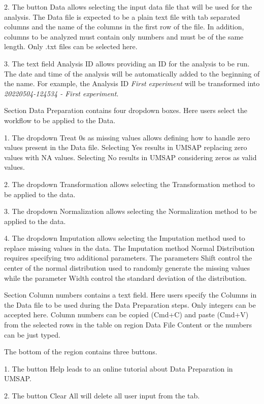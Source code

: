 \num{2}. The button Data allows selecting the input
data file that will be used for the analysis. The Data file is expected to be a
plain text file with tab separated columns and the name of the columns in the first
row of the file. In addition, columns to be analyzed must contain only numbers and
must be of the same length. Only .txt files can be selected here.

\num{3}. The text field Analysis ID allows providing an ID for the analysis
to be run. The date and time of the analysis will be automatically added to the
beginning of the name. For example, the Analysis ID \textit{First experiment} will
be transformed into \textit{20220504-124534 - First experiment}.

Section Data Preparation contains four dropdown boxes. Here users select the workflow
to be applied to the Data.

\num{1}. The dropdown Treat \num{0}s as missing values allows defining how
to handle zero values present in the Data file. Selecting Yes results in UMSAP
replacing zero values with NA values. Selecting No results in UMSAP considering
zeros as valid values.

\num{2}. The dropdown Transformation allows selecting the Transformation method
to be applied to the data.

\num{3}. The dropdown Normalization allows selecting the Normalization method
to be applied to the data.

\num{4}. The dropdown Imputation allows selecting the Imputation method used
to replace missing values in the data. The Imputation method Normal Distribution
requires specifying two additional parameters. The parameters Shift control the
center of the normal distribution used to randomly generate the missing values
while the parameter Width control the standard deviation of the distribution.

Section Column numbers contains a text field. Here users specify the Columns in the
Data file to be used during the Data Preparation steps. Only integers can be accepted
here. Column numbers can be copied (Cmd+C) and paste (Cmd+V) from the selected rows
in the table on region Data File Content or the numbers can be just typed.

The bottom of the region contains three buttons.

\num{1}. The button Help leads to an online tutorial about Data Preparation in
UMSAP.

\num{2}. The button Clear All will delete all user input from the tab.

